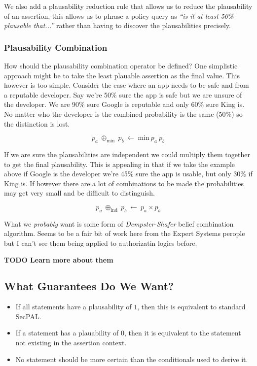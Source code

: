 \documentclass[thesis.tex]{subfiles}
\begin{document}
We also add a plausability reduction rule that allows us to reduce the
plausability of an assertion, this allows us to phrase a policy query
as \emph{``is it at least 50\% plausable that...''} rather than having
to discover the plausabilities precisely.

\subsubsection{Plausability Combination}

How should the plausability combination operator be defined?  One
simplistic approach might be to take the least plauable assertion as
the final value.  This however is too simple. Consider the case where
an app needs to be safe and from a reputable developer.  Say we're
50\% sure the app is safe but we are unsure of the developer. We are
90\% sure Google is reputable and only 60\% sure King is.  No matter
who the developer is the combined probability is the same (50\%) so
the distinction is lost.

\begin{equation}
  p_a~\oplus_{\text{min}}~p_b~\gets~\text{min}~p_a~p_b
\end{equation}

If we are sure the plausabilities are independent we could multiply
them together to get the final plausability. This is appealing in that
if we take the example above if Google is the developer we're 45\%
sure the app is usable, but only 30\% if King is.  If however there
are a lot of combinations to be made the probabilities may get very
small and be difficult to distinguish.

\begin{equation}
  p_a~\oplus_{\text{ind}}~p_b~\gets~p_a\times p_b
\end{equation}

What we \emph{probably} want is some form of \emph{Dempster-Shafer}
belief combination algorithm.  Seems to be a fair bit of work here
from the Expert Systems perople but I can't see them being applied to
authorizatin logics before.

\textbf{TODO Learn more about them}

\subsection{What Guarantees Do We Want?} 

\begin{itemize}
\item If all statements have a plausability of $1$, then this is
  equivalent to standard SecPAL.
\item If a statement has a plauability of $0$, then it is equivalent
  to the statement not existing in the assertion context.
\item No statement should be more certain than the conditionals used
  to derive it.
\end{itemize}
\end{document}
